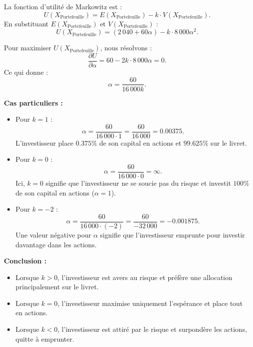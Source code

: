 \documentclass[12pt,a4paper]{article}
\begin{document}
La fonction d’utilité de Markowitz est :
\[
U(X_{\text{Portefeuille}}) = E(X_{\text{Portefeuille}}) - k \cdot V(X_{\text{Portefeuille}}).
\]
En substituant \(E(X_{\text{Portefeuille}})\) et \(V(X_{\text{Portefeuille}})\) :
\[
U(X_{\text{Portefeuille}}) = (2\,040 + 60\alpha) - k \cdot 8\,000 \alpha^2.
\]

Pour maximiser \(U(X_{\text{Portefeuille}})\), nous résolvons :
\[
\frac{\partial U}{\partial \alpha} = 60 - 2k \cdot 8\,000 \alpha = 0.
\]
Ce qui donne :
\[
\alpha = \frac{60}{16\,000k}.
\]

\textbf{Cas particuliers :}
\begin{itemize}
	\item Pour \(k = 1\) :
	\[
	\alpha = \frac{60}{16\,000 \cdot 1} = \frac{60}{16\,000} = 0.00375.
	\]
	L’investisseur place \(0.375\%\) de son capital en actions et \(99.625\%\) sur le livret.
	
	\item Pour \(k = 0\) :
	\[
	\alpha = \frac{60}{16\,000 \cdot 0} = \infty.
	\]
	Ici, \(k = 0\) signifie que l’investisseur ne se soucie pas du risque et investit \(100\%\) de son capital en actions (\(\alpha = 1\)).
	
	\item Pour \(k = -2\) :
	\[
	\alpha = \frac{60}{16\,000 \cdot (-2)} = \frac{60}{-32\,000} = -0.001875.
	\]
	Une valeur négative pour \(\alpha\) signifie que l’investisseur emprunte pour investir davantage dans les actions.
\end{itemize}

\textbf{Conclusion :}
\begin{itemize}
	\item Lorsque \(k > 0\), l’investisseur est avers au risque et préfère une allocation principalement sur le livret.
	\item Lorsque \(k = 0\), l’investisseur maximise uniquement l’espérance et place tout en actions.
	\item Lorsque \(k < 0\), l’investisseur est attiré par le risque et surpondère les actions, quitte à emprunter.
\end{itemize}
	
\end{document}
